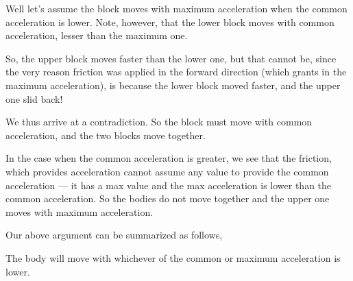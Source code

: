 Well let's assume the block moves with maximum acceleration when the common acceleration is lower.
Note, however, that the lower block moves with common acceleration, lesser than the maximum one.

So, the upper block moves faster than the lower one, but that cannot be, since the very reason 
friction was applied in the forward direction (which grants in the maximum acceleration),
is because the lower block moved faster, and the upper one slid back!

We thus arrive at a contradiction. So the block must move with common acceleration, and 
the two blocks move together.

In the case when the common acceleration is greater, we see that the friction, which provides 
acceleration cannot assume any value to provide the common acceleration --- it has a max value 
and the max acceleration is lower than the common acceleration. So the bodies do not move together 
and the upper one moves with maximum acceleration.

Our above argument can be summarized as follows,

\begin{mdframed}
    The body will move with whichever of the common or maximum acceleration is lower.
\end{mdframed}

